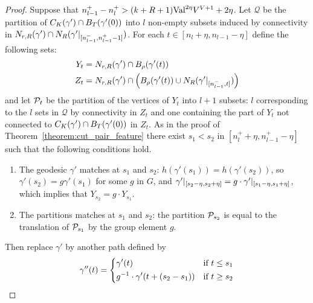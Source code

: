 \begin{proof}
  Suppose that $n_{l - 1}^+ - n_l^+ > (k + R + 1)\mathrm{Val}^{2\eta} V^{V+1} + 2\eta$. 
  Let $\mathcal{Q}$ be the partition of $C_K(\gamma') \cap B_{T}(\gamma'(0))$ into $l$ non-empty subsets induced by connectivity in $N_{r, R}(\gamma') \cap N_R(\gamma'\vert_{[n_{l-1}^-, n_{l-1}^+-1]})$.  
  For each $t \in [n_l + \eta, n_{l-1} - \eta]$ define the following sets:
  \begin{align}
    Y_t &= N_{r, R}(\gamma') \cap B_{\rho}(\gamma'(t)) \\
    Z_t &= N_{r, R}(\gamma') \cap \left(B_{\rho}(\gamma'(t)) \cup
      N_R(\gamma'\vert_{[n_{l-1}^-, t]})\right)
  \end{align}
  and let $\mathcal{P}_t$ be the partition of the vertices of $Y_t$ into $l + 1$ subsets: $l$ corresponding to the $l$ sets in $\mathcal{Q}$ by connectivity in $Z_t$ and one containing the part of $Y_t$ not connected to $C_K(\gamma') \cap B_{T}(\gamma'(0))$ in $Z_t$.  
  As in the proof of Theorem~\ref{theorem:cut_pair_feature} there exist $s_1 < s_2$ in $[n^+_l + \eta, n^+_{l-1} - \eta]$ such that the following conditions hold.
  \begin{enumerate}
    \item The geodesic $\gamma'$ matches at $s_1$ and $s_2$:  $h(\gamma'(s_1)) = h(\gamma'(s_2))$, so $\gamma'(s_2) = g\gamma'(s_1)$ for some $g$ in $G$, and $\gamma'\vert_{[s_2-\eta,s_2+\eta]} = g\cdot\gamma' \vert_{[s_1-\eta,s_1+\eta]}$, which implies that $Y_{s_2} = g\cdot Y_{s_1}$.
    \item The partitions matches at $s_1$ and $s_2$: the partition $\mathcal{P}_{s_2}$ is equal to the translation of $\mathcal{P}_{s_1}$ by the group element $g$.
  \end{enumerate}
  Then replace $\gamma'$ by another path defined by
  \begin{align} 
    \gamma''(t) = 
      \begin{dcases}
        \gamma'(t) & \text{if $t \leq s_1$}\\
        g^{-1}\cdot \gamma'(t + (s_2 - s_1)) & \text{if $t \geq s_2$} \\
      \end{dcases}
  \end{align}


\end{proof}
